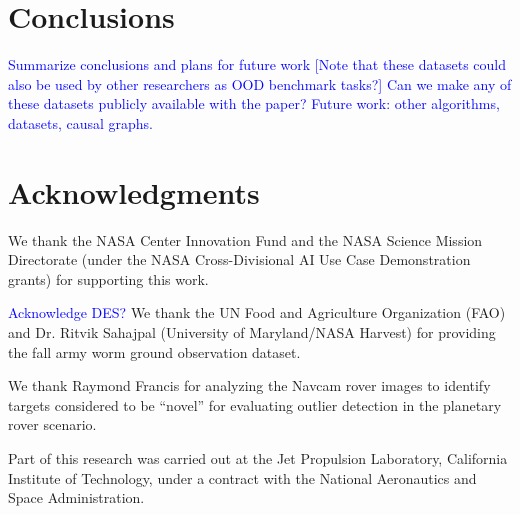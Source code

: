\documentclass[letterpaper]{article} %
\newcommand{\todo}[1]{\textcolor{blue}{#1}}
\begin{document}
\section{Conclusions}
\todo{
Summarize conclusions and plans for future work
[Note that these datasets could also be used by other researchers as OOD
 benchmark tasks?]
 \todo{Can we make any of these datasets publicly available with the paper?}
 \todo{Future work: other algorithms, datasets, causal graphs.}
}




\section{Acknowledgments}
We thank the NASA Center Innovation Fund and the NASA Science Mission 
Directorate (under the NASA Cross-Divisional AI Use Case Demonstration grants)
 for supporting this work.

\todo{Acknowledge DES?}
We thank the UN Food and Agriculture Organization (FAO) and Dr. Ritvik Sahajpal
(University of Maryland/NASA Harvest) for providing the fall army worm ground
 observation dataset.

We thank Raymond Francis for analyzing the Navcam rover images to
identify targets considered to be ``novel'' for evaluating outlier
detection in the planetary rover scenario.

Part of this research was carried out at the Jet Propulsion
Laboratory, California Institute of Technology, under a contract with
the National Aeronautics and Space Administration.
\end{document}
